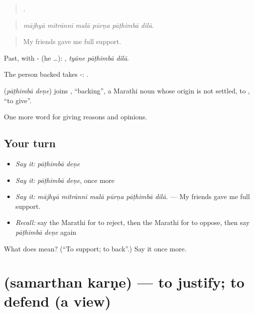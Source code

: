 \begin{quote}
     .
\end{quote}

\begin{quote}
\emph{mājhyā mitrānnī malā pūrṇa pāṭhimbā dilā.}
\end{quote}

\begin{quote}
My friends gave me full support.
\end{quote}

Past, with - (he …):   , \emph{tyāne pāṭhimbā dilā}.

The person backed takes -:   .

\begin{cousinweb}
\textbf{ } (\emph{pāṭhimbā deṇe}) joins , \textquotedblleft{}backing\textquotedblright{}, a Marathi noun whose origin is not settled, to , \textquotedblleft{}to give\textquotedblright{}.
\end{cousinweb}

\begin{grammarlens}[title={What you've built}]
One more word for giving reasons and opinions.
\end{grammarlens}

\subsection*{Your turn}
\begin{itemize}
\raggedright
  \item \emph{Say it:} \emph{pāṭhimbā deṇe}
  \item \emph{Say it:} \emph{pāṭhimbā deṇe}, once more
  \item \emph{Say it:} \emph{mājhyā mitrānnī malā pūrṇa pāṭhimbā dilā.} — My friends gave me full support.
  \item \emph{Recall:} say the Marathi for to reject, then the Marathi for to oppose, then say \emph{pāṭhimbā deṇe} again
\end{itemize}

\begin{tcolorbox}[breakable,colback=teal!4,colframe=teal!35!black,title={Before you move on}]
What does   mean? (\textquotedblleft{}To support; to back\textquotedblright{}.) Say it once more.
\end{tcolorbox}
\section[\texorpdfstring{\mr{समर्थन} \mr{करणे} (samarthan karṇe)}{समर्थन करणे (samarthan karṇe)}]{  (samarthan karṇe) — to justify; to defend (a view)}

